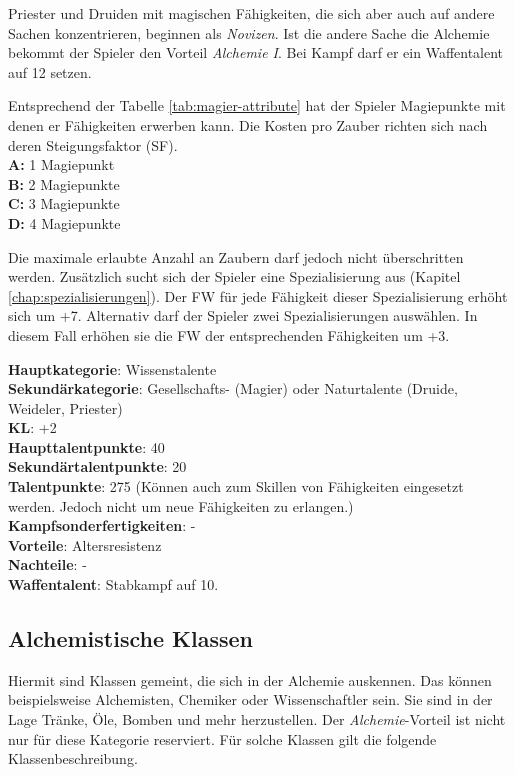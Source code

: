 Priester und Druiden mit magischen Fähigkeiten, die sich aber auch auf andere Sachen konzentrieren, beginnen als \textit{Novizen}. Ist die andere Sache die Alchemie bekommt der Spieler den Vorteil \textit{Alchemie I}. Bei Kampf darf er ein Waffentalent auf 12 setzen.

Entsprechend der Tabelle \ref{tab:magier-attribute} hat der Spieler Magiepunkte mit denen er Fähigkeiten erwerben kann. Die Kosten pro Zauber richten sich nach deren Steigungsfaktor (SF). \\
\textbf{A:} 1 Magiepunkt \\
\textbf{B:} 2 Magiepunkte \\
\textbf{C:} 3 Magiepunkte \\
\textbf{D:} 4 Magiepunkte 

Die maximale erlaubte Anzahl an Zaubern darf jedoch nicht überschritten werden. Zusätzlich sucht sich der Spieler eine Spezialisierung aus (Kapitel \ref{chap:spezialisierungen}). Der FW für jede Fähigkeit dieser Spezialisierung erhöht sich um +7. Alternativ darf der Spieler zwei Spezialisierungen auswählen. In diesem Fall erhöhen sie die FW der entsprechenden Fähigkeiten um +3.

\textbf{Hauptkategorie}: Wissenstalente \\
\textbf{Sekundärkategorie}: Gesellschafts- (Magier) oder Naturtalente (Druide, Weideler, Priester) \\
\textbf{KL}: +2 \\
\textbf{Haupttalentpunkte}: 40 \\
\textbf{Sekundärtalentpunkte}: 20 \\
\textbf{Talentpunkte}: 275 (Können auch zum Skillen von Fähigkeiten eingesetzt werden. Jedoch nicht um neue Fähigkeiten zu erlangen.) \\
\textbf{Kampfsonderfertigkeiten}: - \\
\textbf{Vorteile}: Altersresistenz \\
\textbf{Nachteile}: - \\
\textbf{Waffentalent}: Stabkampf auf 10.

\subsection{Alchemistische Klassen}
Hiermit sind Klassen gemeint, die sich in der Alchemie auskennen. Das können beispielsweise Alchemisten, Chemiker oder Wissenschaftler sein. Sie sind in der Lage Tränke, Öle, Bomben und mehr herzustellen. Der \textit{Alchemie}-Vorteil ist nicht nur für diese Kategorie reserviert. Für solche Klassen gilt die folgende Klassenbeschreibung.

